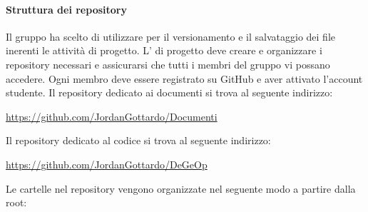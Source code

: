   \paragraph{Struttura dei repository}
  Il gruppo ha scelto di utilizzare  per il versionamento e il salvataggio dei file inerenti le attività di progetto. L'\amministratore{} di progetto deve creare e organizzare i repository necessari e assicurarsi che tutti i membri del gruppo vi possano accedere. Ogni membro deve essere registrato su GitHub e aver attivato l'account studente.
  \newline \newline
  Il repository dedicato ai documenti si trova al seguente indirizzo:
  \begin{center}
  	\url{https://github.com/JordanGottardo/Documenti}
  \end{center}
  Il repository dedicato al codice si trova al seguente indirizzo:
  \begin{center}
  	\url{https://github.com/JordanGottardo/DeGeOp}
  \end{center}
  Le cartelle nel repository vengono organizzate nel seguente modo a partire dalla root:
